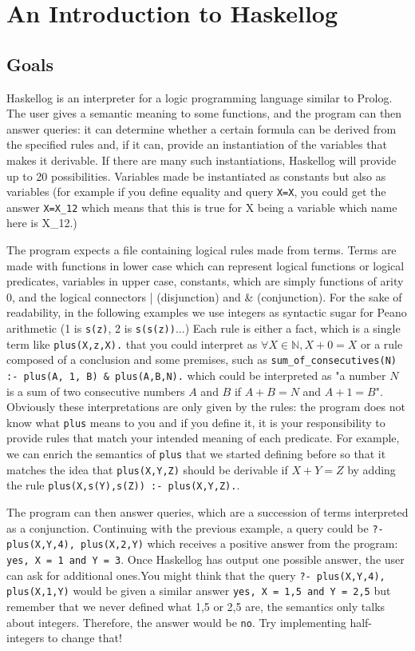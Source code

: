 \section{An Introduction to Haskellog}

\subsection{Goals}

Haskellog is an interpreter for a logic programming language similar to Prolog. The user gives a semantic meaning to some functions, and the program can then answer queries: it can determine whether a certain formula can be derived from the specified rules and, if it can, provide an instantiation of the variables that makes it derivable. If there are many such instantiations, Haskellog will provide up to 20 possibilities. Variables made be instantiated as constants but also as variables (for example if you define equality and query \verb|X=X|, you could get the answer \verb|X=X_12| which means that this is true for X being a variable which name here is X\_12.)

The program expects a file containing logical rules made from terms.
Terms are made with functions in lower case which can represent logical functions or logical predicates, variables in upper case, constants, which are simply functions of arity 0, and the logical connectors | (disjunction) and \& (conjunction). For the sake of readability, in the following examples we use integers as syntactic sugar for Peano arithmetic (1 is \verb|s(z)|, 2 is \verb|s(s(z))|...)
Each rule is either a fact, which is a single term like \verb|plus(X,z,X).| that you could interpret as $\forall X \in \mathbb{N}, X+0 = X$ or a rule composed of a conclusion and some premises, such as \verb|sum_of_consecutives(N) :- plus(A, 1, B) & plus(A,B,N).| which could be interpreted as "a number $N$ is a sum of two consecutive numbers $A$ and $B$ if $A + B = N$ and $A + 1 = B$". Obviously these interpretations are only given by the rules: the program does not know what \verb|plus| means to you and if you define it, it is your responsibility to provide rules that match your intended meaning of each predicate.
\newline
For example, we can enrich the semantics of \verb|plus| that we started defining before so that it matches the idea that \verb|plus(X,Y,Z)| should be derivable if $X+Y=Z$ by adding the rule \verb|plus(X,s(Y),s(Z)) :- plus(X,Y,Z).|.

The program can then answer queries, which are a succession of terms interpreted as a conjunction. Continuing with the previous example, a query could be \verb|?- plus(X,Y,4), plus(X,2,Y)| which receives a positive answer from the program: \verb|yes, X = 1 and Y = 3|. Once Haskellog has output one possible answer, the user can ask for additional ones.\newline You might think that the query \verb|?- plus(X,Y,4), plus(X,1,Y)| would be given a similar answer \verb|yes, X = 1,5 and Y = 2,5| but remember that we never defined what 1,5 or 2,5 are, the semantics only talks about integers. Therefore, the answer would be \verb|no|. Try implementing half-integers to change that!

